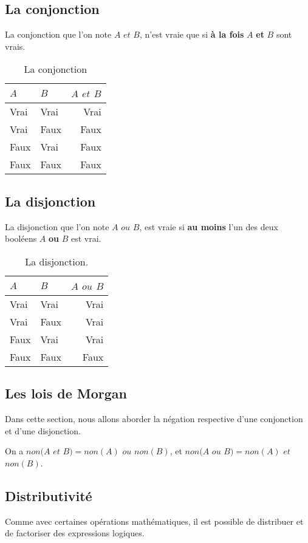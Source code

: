 \subsection{La conjonction}
La conjonction que l'on note $A$ $et$ $B$, n'est vraie que si \textbf{à la fois} $A$ \textbf{et} $B$ sont vrais.
\begin{table}[h]
\centering
\begin{tabu} spread \linewidth {|l|l|r|}
\hline
$A$ & $B$ & $A$ $et$ $B$ \\ \hline
Vrai & Vrai & Vrai \\ \hline
Vrai & Faux & Faux \\ \hline
Faux & Vrai & Faux \\ \hline
Faux & Faux & Faux \\ \hline
\end{tabu}
\caption{La conjonction}
\end{table}
\subsection{La disjonction}
La disjonction que l'on note $A$ $ou$ $B$, est vraie si \textbf{au moins} l'un des deux booléens $A$ \textbf{ou} $B$ est vrai.
\begin{table}[h]
\centering
\begin{tabu} spread \linewidth {|l|l|r|}
\hline
$A$ & $B$ & $A$ $ou$ $B$ \\ \hline
Vrai & Vrai & Vrai \\ \hline
Vrai & Faux & Vrai \\ \hline
Faux & Vrai & Vrai \\ \hline
Faux & Faux & Faux \\ \hline
\end{tabu}
\caption{La disjonction.}
\end{table}
\subsection{Les lois de Morgan}
Dans cette section, nous allons aborder la négation respective d'une conjonction et d'une disjonction.

On a $non(A$ $et$ $B) = non(A)$ $ou$ $non(B)$,
et $non(A$ $ou$ $B) = non(A)$ $et$ $non(B)$.

\subsection{Distributivité}
Comme avec certaines opérations mathématiques, il est possible de distribuer et de factoriser des expressions logiques.

